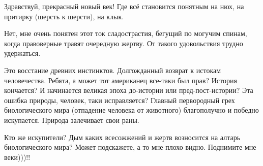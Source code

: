 Здравствуй, прекрасный новый век! Где всё становится понятным на нюх, на
притирку (шерсть к шерсти), на клык.

Нет, мне очень понятен этот ток сладострастия, бегущий по могучим спинам, когда
правоверные травят очередную жертву. От такого удовольствия трудно удержаться.

Это восстание древних инстинктов. Долгожданный возврат к истокам человечества.
Ребята, а может тот американец все-таки был прав? История кончается? И
начинается великая эпоха до-истории или пред-пост-истории? Эта ошибка природы,
человек, таки исправляется? Главный первородный грех биологического мира
(отпадение человека от животного) благополучно и победно искупается. Природа
залечивает свои раны. 

Кто же искупители? Дым каких всесожжений и жертв возносится на алтарь
биологического мира? Может подскажете, а то мне плохо видно. Поднимите мне
веки)))!!

